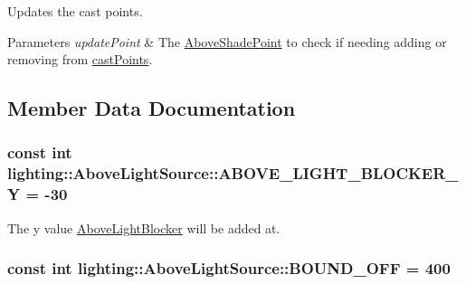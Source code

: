 Updates the cast points. 


\begin{DoxyParams}{Parameters}
{\em update\+Point} & The \hyperlink{classlighting_1_1AboveShadePoint}{Above\+Shade\+Point} to check if needing adding or removing from \hyperlink{classlighting_1_1AboveLightSource_a59d73c54616c32422d4cbea6b981022e}{cast\+Points}.\\
\hline
\end{DoxyParams}


\subsection{Member Data Documentation}
\subsubsection[{\texorpdfstring{A\+B\+O\+V\+E\+\_\+\+L\+I\+G\+H\+T\+\_\+\+B\+L\+O\+C\+K\+E\+R\+\_\+Y}{ABOVE_LIGHT_BLOCKER_Y}}]{\setlength{\rightskip}{0pt plus 5cm}const int lighting\+::\+Above\+Light\+Source\+::\+A\+B\+O\+V\+E\+\_\+\+L\+I\+G\+H\+T\+\_\+\+B\+L\+O\+C\+K\+E\+R\+\_\+Y = -\/30\hspace{0.3cm}{\ttfamily [static]}}\hypertarget{classlighting_1_1AboveLightSource_aefd3bdb1bb3d0a20657812f75b23f8b2}{}\label{classlighting_1_1AboveLightSource_aefd3bdb1bb3d0a20657812f75b23f8b2}


The y value \hyperlink{classlighting_1_1AboveLightBlocker}{Above\+Light\+Blocker} will be added at. 

\subsubsection[{\texorpdfstring{B\+O\+U\+N\+D\+\_\+\+O\+FF}{BOUND_OFF}}]{\setlength{\rightskip}{0pt plus 5cm}const int lighting\+::\+Above\+Light\+Source\+::\+B\+O\+U\+N\+D\+\_\+\+O\+FF = 400\hspace{0.3cm}{\ttfamily [static]}}\hypertarget{classlighting_1_1AboveLightSource_aa87131309853cc76a946de6e004aa778}{}\label{classlighting_1_1AboveLightSource_aa87131309853cc76a946de6e004aa778}


